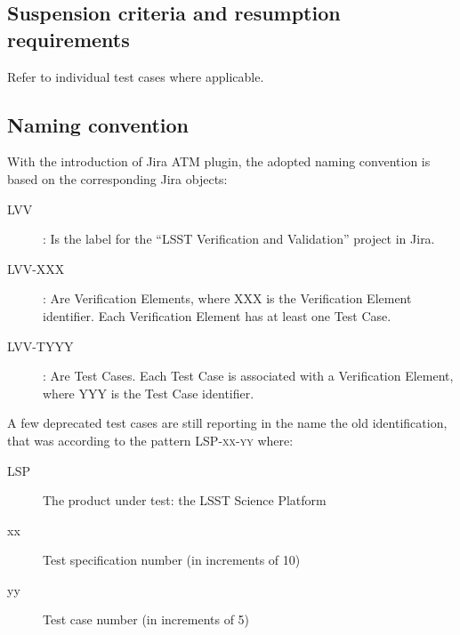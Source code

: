 \documentclass[DM,lsstdraft,STS,toc]{lsstdoc}
\begin{document}
\subsection{Suspension criteria and resumption requirements}
\label{suspension}

Refer to individual test cases where applicable.

\subsection{Naming convention}

With the introduction of Jira ATM plugin, the adopted naming convention is based on the corresponding Jira objects:

\begin{description}
  \item[LVV]{: Is the label for the ``LSST Verification and Validation'' project in Jira.}
  \item[LVV-XXX]{: Are Verification Elements, where XXX is the Verification Element identifier.  Each Verification Element has at least one Test Case. }
  \item[LVV-TYYY]{: Are Test Cases. Each Test Case is associated with a Verification Element, where YYY is the Test Case identifier.}
\end{description}


A few deprecated test cases are still reporting in the name the old identification, that was according to the pattern \textsc{LSP-xx-yy} where:

\begin{description}

  \item[LSP]{The product under test: the LSST Science Platform}
  \item[xx]{Test specification number (in increments of 10)}
  \item[yy]{Test case number (in increments of 5)}

\end{description}


\end{document}
